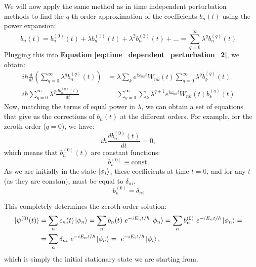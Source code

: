 We will now apply the same method as in time independent perturbation methods to find the $q$-th order approximation of the coefficients $b_n(t)$ using the power expansion:
\begin{equation}
    b_n(t) = b_n^{(0)}(t) + \lambda b_n^{(1)}(t) + \lambda^2 b_n^{(2)}(t) + \dots = \sum_{q=0}^\infty \lambda^q b_n^{(q)}(t)
\end{equation}
Plugging this into \textbf{Equation \ref{eq:time_dependent_perturbation_2}}, we obtain:
\begin{equation} \label{eq:time_dependent_perturbation_3}
    \begin{split}
        i\hbar \frac{d}{dt}\left(\sum_{q=0}^\infty \lambda^q b_n^{(q)}(t)\right)  &= \lambda\sum_{k} e^{i\omega_{nk}t}W_{nk}(t)\sum_{q=0}^\infty \lambda^q b_k^{(q)}(t)\\
        i\hbar \sum_{q=0}^\infty \lambda^q\frac{d b_n^{(q)}(t)}{dt}  &= \sum_{q=0}^\infty\sum_{k} \lambda^{q+1}e^{i\omega_{nk}t}W_{nk}(t)  b_k^{(q)}(t)
    \end{split}
\end{equation}
Now, matching the terms of equal power in $\lambda$, we can obtain a set of equations that give us the corrections of $b_n(t)$ at the different orders. For example, for the zeroth order ($q = 0$), we have:
\begin{equation}
    i\hbar \frac{db_n^{(0)}(t)}{dt} = 0,
\end{equation}
which means that $b_n^{(0)}(t)$ are constant functions:
\begin{equation}
    b_n^{(0)} \equiv \text{const.}
\end{equation}
As we are initially in the state $\ket{\phi_i}$, these coefficients at time $t=0$, and for any $t$ (as they are constan), must be equal to $\delta_{ni}$.
\begin{equation}
    b_n^{(0)} = \delta_{ni}
\end{equation}

This completely determines the zeroth order solution:
\begin{equation}
    \begin{split}
        \ket{\psi^{(0)}(t)} &= \sum_n c_n(t) \ket{\phi_n} = \sum_n b_n(t)\ e^{-iE_nt/\hbar} \ket{\phi_n} = \sum_n b_n^{(0)}\ e^{-iE_nt/\hbar} \ket{\phi_n} =\\
        &= \sum_n \delta_{ni}\ e^{-iE_nt/\hbar} \ket{\phi_n} =  \ e^{-iE_it/\hbar} \ket{\phi_i},
    \end{split}
\end{equation}
which is simply the initial stationary state we are starting from.

